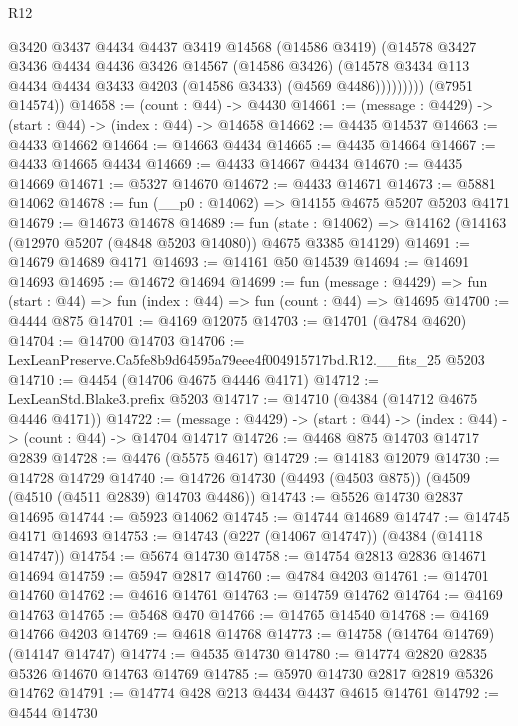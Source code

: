 \begin{lexlean}{R12}
\begin{coremodule}
                  @3420
                  @3437
                  @4434
                  @4437
                  @3419
                  @14568
                  (@14586 @3419)
                  (@14578
                    @3427
                    @3436
                    @4434
                    @4436
                    @3426
                    @14567
                    (@14586 @3426)
                    (@14578 @3434 @113 @4434 @4434 @3433 @4203 (@14586 @3433) (@4569 @4486)))))))))
      (@7951 @14574))
@14658 := (count : @44) -> @4430
@14661 := (message : @4429) -> (start : @44) -> (index : @44) -> @14658
@14662 := @4435 @14537
@14663 := @4433 @14662
@14664 := @14663 @4434
@14665 := @4435 @14664
@14667 := @4433 @14665 @4434
@14669 := @4433 @14667 @4434
@14670 := @4435 @14669
@14671 := @5327 @14670
@14672 := @4433 @14671
@14673 := @5881 @14062
@14678 := fun (__p0 : @14062) => @14155 @4675 @5207 @5203 @4171
@14679 := @14673 @14678
@14689 := fun (state : @14062) =>
  @14162 (@14163 (@12970 @5207 (@4848 @5203 @14080)) @4675 @3385 @14129)
@14691 := @14679 @14689 @4171
@14693 := @14161 @50 @14539
@14694 := @14691 @14693
@14695 := @14672 @14694
@14699 := fun (message : @4429) =>
  fun (start : @44) => fun (index : @44) => fun (count : @44) => @14695
@14700 := @4444 @875
@14701 := @4169 @12075
@14703 := @14701 (@4784 @4620)
@14704 := @14700 @14703
@14706 := LexLeanPreserve.Ca5fe8b9d64595a79eee4f004915717bd.R12.__fits_25 @5203
@14710 := @4454 (@14706 @4675 @4446 @4171)
@14712 := LexLeanStd.Blake3.prefix @5203
@14717 := @14710 (@4384 (@14712 @4675 @4446 @4171))
@14722 := (message : @4429) -> (start : @44) -> (index : @44) -> (count : @44) -> @14704 @14717
@14726 := @4468 @875 @14703 @14717 @2839
@14728 := @4476 (@5575 @4617)
@14729 := @14183 @12079
@14730 := @14728 @14729
@14740 := @14726 @14730 (@4493 (@4503 @875)) (@4509 (@4510 (@4511 @2839) @14703 @4486))
@14743 := @5526 @14730 @2837 @14695
@14744 := @5923 @14062
@14745 := @14744 @14689
@14747 := @14745 @4171 @14693
@14753 := @14743 (@227 (@14067 @14747)) (@4384 (@14118 @14747))
@14754 := @5674 @14730
@14758 := @14754 @2813 @2836 @14671 @14694
@14759 := @5947 @2817
@14760 := @4784 @4203
@14761 := @14701 @14760
@14762 := @4616 @14761
@14763 := @14759 @14762
@14764 := @4169 @14763
@14765 := @5468 @470
@14766 := @14765 @14540
@14768 := @4169 @14766 @4203
@14769 := @4618 @14768
@14773 := @14758 (@14764 @14769) (@14147 @14747)
@14774 := @4535 @14730
@14780 := @14774 @2820 @2835 @5326 @14670 @14763 @14769
@14785 := @5970 @14730 @2817 @2819 @5326 @14762
@14791 := @14774 @428 @213 @4434 @4437 @4615 @14761
@14792 := @4544 @14730

\end{coremodule}
\end{lexlean}
